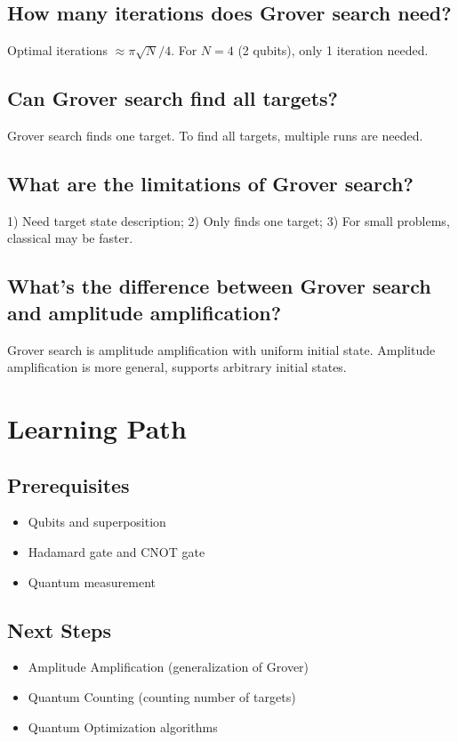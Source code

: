 \documentclass[12pt,a4paper]{article}
\begin{document}
\subsection{How many iterations does Grover search need?}

Optimal iterations $\approx \pi\sqrt{N}/4$. For $N=4$ (2 qubits), only 1 iteration needed.

\subsection{Can Grover search find all targets?}

Grover search finds one target. To find all targets, multiple runs are needed.

\subsection{What are the limitations of Grover search?}

1) Need target state description; 2) Only finds one target; 3) For small problems, classical may be faster.

\subsection{What's the difference between Grover search and amplitude amplification?}

Grover search is amplitude amplification with uniform initial state. Amplitude amplification is more general, supports arbitrary initial states.

\section{Learning Path}

\subsection{Prerequisites}
\begin{itemize}
  \item Qubits and superposition
  \item Hadamard gate and CNOT gate
  \item Quantum measurement
\end{itemize}

\subsection{Next Steps}
\begin{itemize}
  \item Amplitude Amplification (generalization of Grover)
  \item Quantum Counting (counting number of targets)
  \item Quantum Optimization algorithms
\end{itemize}
\end{document}
